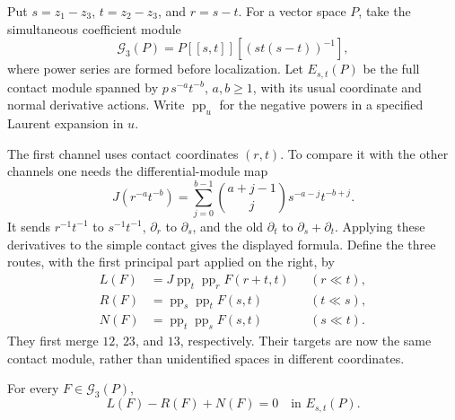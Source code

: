 Put\label{e1f:def:three-contact-coefficients} \(s=z_1-z_3\), \(t=z_2-z_3\), and \(r=s-t\).
For a vector space \(P\), take the simultaneous coefficient
module
\[
 \mathcal G_3(P)=P[[s,t]][(st(s-t))^{-1}],
\]
where power series are formed before localization. Let
\(E_{s,t}(P)\) be the full contact module spanned by
\(p\,s^{-a}t^{-b}\), \(a,b\geq1\), with its usual
coordinate and normal derivative actions. Write
\(\operatorname{pp}_u\) for the negative powers in a
specified Laurent expansion in \(u\).

The\label{e1f:def:contact-coordinate-transfer} first channel uses contact coordinates \((r,t)\).
To compare it with the other channels one needs the
differential-module map
\[
 J(r^{-a}t^{-b})
   =\sum_{j=0}^{b-1}\binom{a+j-1}{j}s^{-a-j}t^{-b+j}.
\]
It sends \(r^{-1}t^{-1}\) to \(s^{-1}t^{-1}\),
\(\partial_r\) to \(\partial_s\), and the old
\(\partial_t\) to \(\partial_s+\partial_t\).
Applying these derivatives to the simple contact gives the
displayed\label{e1f:def:three-principal-part-routes} formula. Define the three routes, with the first
principal part applied on the right, by
\[
 \begin{aligned}
 L(F)&=J\operatorname{pp}_t\operatorname{pp}_rF(r+t,t)
                                      &&(r\ll t),\\
 R(F)&=\operatorname{pp}_s\operatorname{pp}_tF(s,t)
                                      &&(t\ll s),\\
 N(F)&=\operatorname{pp}_t\operatorname{pp}_sF(s,t)
                                      &&(s\ll t).
 \end{aligned}
\]
They first merge \(12\), \(23\), and \(13\), respectively.
Their targets are now the same contact module, rather than
unidentified spaces in different coordinates.

\begin{lemma}
\label{e1f:lem:three-channel}
For every \(F\in\mathcal G_3(P)\),
\[
 L(F)-R(F)+N(F)=0\quad\text{in }E_{s,t}(P).
\]
\end{lemma}

